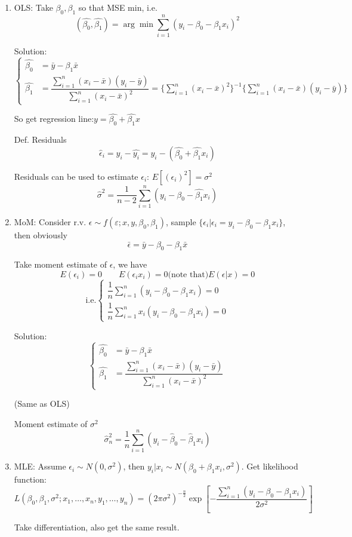 \documentclass[11pt,a4paper]{ctexart}
\numberwithin{equation}{section}%
\begin{document}
    \begin{enumerate}
        \item OLS: Take $\beta_0,\beta_1$  so that MSE min, i.e.
        \[
            (\hat{\beta_0},\hat{\beta_1})=\arg\min\sum_{i=1}^n(y_i-\beta_0-\beta_1 x_i)^2    
        \]

        Solution:
        \[\begin{cases}
            \hat{\beta_0}&=\bar{y}-\beta_1\bar{x}\\
            \hat{\beta_1}&=\dfrac{\sum_{i=1}^n(x_i-\bar{x})(y_i-\bar{y})}{\sum_{i=1}^n(x_i-\bar{x})^2}=\{\sum_{i=1}^n(x_i-\bar{x})^2\}^{-1}\{\sum_{i=1}^n(x_i-\bar{x})(y_i-\bar{y})\}
        \end{cases}\]

        So get regression line:$y=\hat{\beta_0}+\hat{\beta_1}x$

        Def. Residuals
        \[\hat{\epsilon}_i=y_i-\hat{y_i}=y_i-(\hat{\beta_0}+\hat{\beta_1}x_i)\]


        Residuals can be used to estimate $\epsilon_i$: $E[(\epsilon_i)^2]=\sigma^2$
        \[\hat{\sigma}^2=\frac{1}{n-2}\sum_{i=1}^n(y_i-\hat{\beta_0}-\hat{\beta_1}x_i)\]
        \item MoM: Consider r.v. $\epsilon\sim f(\varepsilon;x,y,\beta_0,\beta_1)$, sample $\{\epsilon_i|\epsilon_i=y_i-\beta_0-\beta_1x_i\}$, then obviously
        \[\bar{\epsilon}=\bar{y}-\beta_0-\beta_1\bar{x}\]

        Take moment estimate of $\epsilon$, we have 
        \[E(\epsilon_i)=0\qquad E(\epsilon_i x_i)=0\text{(note that)}E(\epsilon|x)=0\]
        \[\text{i.e.}\begin{cases}
            
            \dfrac{1}{n}\sum_{i=1}^n(y_i-\beta_0-\beta_1x_i)=0\\
            \dfrac{1}{n}\sum_{i=1}^nx_i(y_i-\beta_0-\beta_1x_i)=0
        \end{cases}\]

        Solution:
        \[\begin{cases}
            \hat{\beta_0}&=\bar{y}-\beta_1\bar{x}\\
            \hat{\beta_1}&=\dfrac{\sum_{i=1}^n(x_i-\bar{x})(y_i-\bar{y})}{\sum_{i=1}^n(x_i-\bar{x})^2}
        \end{cases}\]

        (Same as OLS)

        Moment estimate of $\sigma^2$
        \[\hat{\sigma}^2_n=\frac{1}{n}\sum_{i=1}^n(y_i-\hat{\beta}_0-\hat{\beta}_1x_i)\]

        \item MLE: Assume $\epsilon_i\sim N(0,\sigma^2)$, then $y_i|x_i\sim N(\beta_0+\beta_1x_i,\sigma^2)$. Get likelihood function:
        \[
            L(\beta_0,\beta_1,\sigma^2;x_1,\ldots,x_n,y_1,\ldots,y_n)=(2\pi\sigma^2)^{-\frac{n}{2}}\exp\left[-\frac{\sum_{i=1}^n(y_i-\beta_0-\beta_1x_i)}{2\sigma^2}\right]  
        \]

        Take differentiation, also get the same result.
    \end{enumerate}
\end{document}
